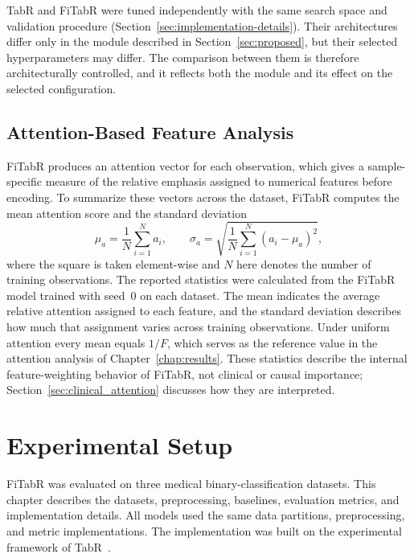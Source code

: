 \documentclass[11pt,a4paper,oneside, openany, reqno, chapter, nokorean]{oblivoir}
\theoremstyle{definition}
\theoremstyle{remark}
\numberwithin{equation}{chapter}
\theoremstyle{definition}
\theoremstyle{remark}
\theoremstyle{definition}
\begin{document}
TabR and FiTabR were tuned independently with the same search space and
validation procedure (Section~\ref{sec:implementation-details}). Their
architectures differ only in the module described in
Section~\ref{sec:proposed}, but their selected hyperparameters may differ. The
comparison between them is therefore architecturally controlled, and it
reflects both the module and its effect on the selected configuration.

\section{Attention-Based Feature Analysis}
\label{sec:attention_stats}

FiTabR produces an attention vector for each observation, which gives a
sample-specific measure of the relative emphasis assigned to numerical
features before encoding. To summarize these vectors across the dataset,
FiTabR computes the mean attention score and the standard deviation
\begin{equation}
  \mu_a = \frac{1}{N}\sum_{i=1}^{N} a_i, \qquad
  \sigma_a = \sqrt{\frac{1}{N}\sum_{i=1}^{N}(a_i - \mu_a)^2},
  \label{eq:attention_stats}
\end{equation}
where the square is taken
element-wise and $N$ here denotes the number of training observations. The
reported statistics were calculated from the FiTabR model trained with seed~0
on each dataset. The mean indicates the average relative attention assigned to
each feature, and the standard deviation describes how much that assignment
varies across training observations. Under uniform attention every mean equals
$1/F$, which serves as the reference value in the attention analysis of
Chapter~\ref{chap:results}. These statistics describe the internal
feature-weighting behavior of FiTabR, not clinical or causal importance;
Section~\ref{sec:clinical_attention} discusses how they are interpreted.
    
\chapter{Experimental Setup}
\label{chap:experimental-setup}
FiTabR was evaluated on three medical binary-classification datasets. This chapter describes
the datasets, preprocessing, baselines, evaluation metrics, and implementation details. All models
used the same data partitions, preprocessing, and metric implementations. The implementation
was built on the experimental framework of TabR~\cite{gorishniy2024tabr}.
\end{document}
